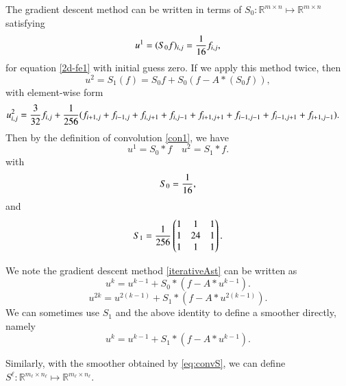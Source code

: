 The gradient descent method can be written in terms of $S_{0}:\mathbb
R^{m\times n}\mapsto \mathbb R^{m\times n}$ satisfying
\begin{equation}
\label{jacobi1}
u^1=(S_{0}f)_{i,j}={1\over 16} f_{i,j},
\end{equation}
for equation \eqref{2d-fe1} with initial guess zero.
If we apply this method twice, then
$$
u^2=S_1(f) = S_{0} f + S_0(f - A\ast(S_{0}f)),
$$
with element-wise form
\begin{equation} 
\begin{aligned}
u^2_{i,j} &={3\over 32}f_{i,j} + {1\over 256}(f_{i+1,j}+f_{i-1,j}+f_{i,j+1}+f_{i,j-1}+f_{i+1,j+1}+f_{i-1,j-1}+f_{i-1,j+1}+f_{i+1,j-1}).
\end{aligned}
\end{equation}
Then by the definition of convolution \eqref{con1}, we have
 \begin{equation}\label{eq:convS}
u^1= S_{0}\ast f \quad u^2 = S_1 \ast f.
\end{equation}
with
\begin{equation}\label{eq:kernel-S}
S_{0} = {1 \over 16},
\end{equation}
and 
\begin{equation}\label{eq:kernel-S2}
S_1={1\over 256} \begin{pmatrix}
1 & 1 & 1 \\
1 & 24 & 1  \\
1 &1  & 1
\end{pmatrix}.
\end{equation}




We note the gradient descent method \eqref{iterativeAst} can be written as
\begin{equation}\label{GD0}
u^k=u^{k-1} + S_0\ast (f-A\ast u^{k-1}).
\end{equation}
\begin{equation}\label{GD1}
u^{2k}=u^{2(k-1)} + S_1\ast (f-A\ast u^{2(k-1)}).
\end{equation}
We can sometimes use $S_1$ and the above identity to define a smoother
directly, namely 
\begin{equation}\label{GD2}
u^{k}=u^{k-1} + S_1\ast (f-A\ast u^{k-1}).
\end{equation}


Similarly, with the smoother obtained by \eqref{eq:convS}, we can define 
$S^{\ell}: \mathbb{R}^{m_\ell \times n_\ell} \mapsto \mathbb{R}^{m_\ell \times n_\ell}$.


